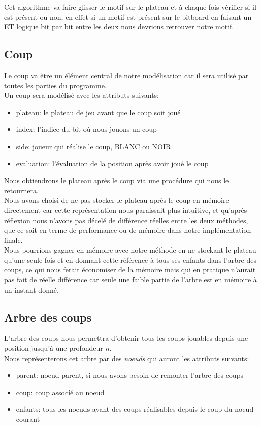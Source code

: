 \documentclass{article}
\begin{document}
Cet algorithme va faire glisser le motif sur le plateau et à chaque fois vérifier si il est présent ou non, en effet
si un motif est présent sur le bitboard en faisant un ET logique bit par bit entre les deux nous devrions retrouver
notre motif.

\pagebreak
\subsection{Coup}

Le coup va être un élément central de notre modélisation car il sera utilisé par toutes les parties du programme.\\
Un coup sera modélisé avec les attributs suivants:
\begin{itemize}
\item plateau: le plateau de jeu avant que le coup soit joué
\item index: l'indice du bit où nous jouons un coup
\item side: joueur qui réalise le coup, BLANC ou NOIR
\item evaluation: l'évaluation de la position après avoir joué le coup\\
\end{itemize}

Nous obtiendrons le plateau après le coup via une procédure qui nous le retournera.\\
Nous avons choisi de ne pas stocker le plateau après le coup en mémoire directement car cette représentation
nous paraissait plus intuitive, et qu'après réflexion nous n'avons pas décelé de différence réelles entre les deux
méthodes, que ce soit en terme de performance ou de mémoire dans notre implémentation finale.\\

Nous pourrions gagner en mémoire avec notre méthode en ne stockant le plateau qu'une seule fois et en donnant cette référence
à tous ses enfants dans l'arbre des coups, ce qui nous ferait économiser de la mémoire mais qui en pratique n'aurait pas fait 
de réelle différence car seule une faible partie de l'arbre est en mémoire à un instant donné.

\subsection{Arbre des coups}

L'arbre des coups nous permettra d'obtenir tous les coups jouables depuis une position jusqu'à une profondeur $n$.\\
Nous représenterons cet arbre par des \textit{noeuds} qui auront les attributs suivants:
\begin{itemize}
\item parent: noeud parent, si nous avons besoin de remonter l'arbre des coups
\item coup: coup associé au noeud
\item enfants: tous les noeuds ayant des coups réalisables depuis le coup du noeud courant \\
\end{itemize}
\end{document}
